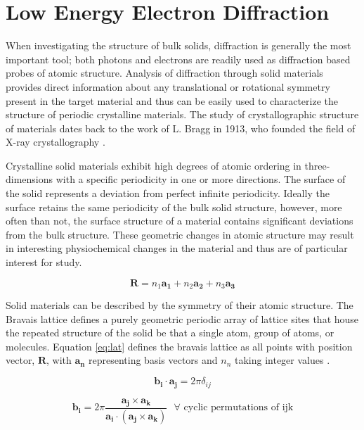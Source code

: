 \section{Low Energy Electron Diffraction}
When investigating the structure of bulk solids, diffraction is generally the most important tool; both photons and electrons are readily used as diffraction based probes of atomic structure. Analysis of diffraction through solid materials provides direct information about any translational or rotational symmetry present in the target material and thus can be easily used to characterize the structure of periodic crystalline materials. The study of crystallographic structure of materials dates back to the work of L. Bragg in 1913, who founded the field of X-ray crystallography \cite{Ashcroft}.

Crystalline solid materials exhibit high degrees of atomic ordering in three-dimensions with a specific periodicity in one or more directions. The surface of the solid represents a deviation from perfect infinite periodicity. Ideally the surface retains the same periodicity of the bulk solid structure, however, more often than not, the surface structure of a material contains significant deviations from the bulk structure. These geometric changes in atomic structure may result in interesting physiochemical changes in the material and thus are of particular interest for study.

\begin{equation}
\label{eq:lat}
\mathbf{R} = n_1 \mathbf{a_1} + n_2 \mathbf{a_2} + n_3 \mathbf{a_3}
\end{equation}


Solid materials can be described by the symmetry of their atomic structure. The Bravais lattice defines a purely geometric periodic array of lattice sites that house the repeated structure of the solid be that a single atom, group of atoms, or molecules. Equation \ref{eq:lat} defines the bravais lattice as all points with position vector, $\mathbf{R}$, with $\mathbf{a_n}$ representing basis vectors and  $n_n$ taking integer values \cite{Ashcroft}.

\begin{equation}
\label{eq:rlat1}
\mathbf{ b_i \cdot a_j} = 2\pi \delta_{ij}
\end{equation}

\begin{equation}
\label{eq:rlat2}
\mathbf{b_i} = 2\pi \frac{\mathbf{a_j \times a_k}}{\mathbf{a_i \cdot (a_j \times a_k)}} \text{  }\forall \text{ cyclic permutations of ijk}
\end{equation}

